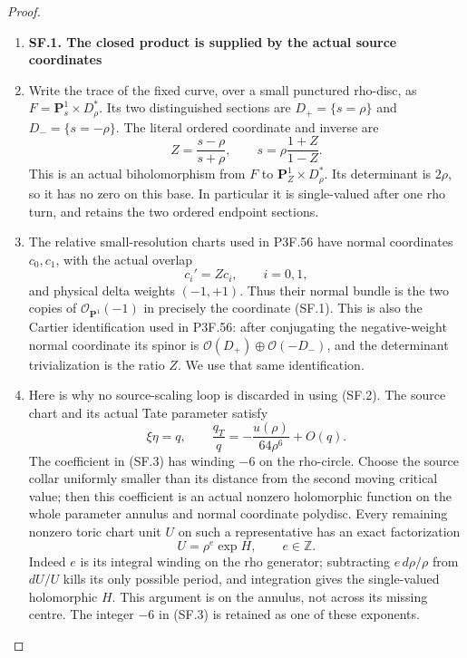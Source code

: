 \begin{proof}
\begin{enumerate}[label=\arabic*.]
\item \par

\medskip\noindent\textbf{SF.1. The closed product is supplied by the actual source coordinates}

\par\nobreak

\item Write the trace of the fixed curve, over a small punctured rho-disc, as
\(F=\mathbf P^1_s\times D_\rho^*\). Its two distinguished sections are
\(D_+=\{s=\rho\}\) and \(D_-=\{s=-\rho\}\). The literal ordered
coordinate and inverse are
\[
 Z=\frac{s-\rho}{s+\rho},\qquad
 s=\rho\frac{1+Z}{1-Z}.                                      \tag{SF.1}
\]
This is an actual biholomorphism from \(F\) to
\(\mathbf P^1_Z\times D_\rho^*\). Its determinant is \(2\rho\), so
it has no zero on this base. In particular it is single-valued after
one rho turn, and retains the two ordered endpoint sections.

\item The relative small-resolution charts used in P3F.56 have normal
coordinates \(c_0,c_1\), with the actual overlap
\[
             c_i'=Zc_i,\qquad i=0,1,                       \tag{SF.2}
\]
and physical delta weights \((-1,+1)\). Thus their normal bundle is the
two copies of \(\mathcal O_{\mathbf P^1}(-1)\) in precisely the
coordinate (SF.1). This is also the Cartier identification used in
P3F.56: after conjugating the negative-weight normal coordinate its
spinor is
\(\mathcal O(D_+)\oplus\mathcal O(-D_-)\), and the determinant
trivialization is the ratio \(Z\). We use that same identification.

\item Here is why no source-scaling loop is discarded in using (SF.2).
The source chart and its actual Tate parameter satisfy
\[
 \xi\eta=q,\qquad
 \frac{q_T}{q}=-\frac{u(\rho)}{64\rho^6}+O(q).               \tag{SF.3}
\]
The coefficient in (SF.3) has winding \(-6\) on the rho-circle.
Choose the source collar uniformly smaller than its distance from the
second moving critical value; then this coefficient is an actual
nonzero holomorphic function on the whole parameter annulus and
normal coordinate polydisc. Every remaining nonzero toric chart unit
\(U\) on such a representative has an exact factorization
\[
                    U=\rho^{e}\exp H,\qquad e\in\mathbb Z. \tag{SF.4}
\]
Indeed \(e\) is its integral winding on the rho generator; subtracting
\(e\,d\rho/\rho\) from \(dU/U\) kills its only possible period,
and integration gives the single-valued holomorphic \(H\). This
argument is on the annulus, not across its missing centre. The integer
\(-6\) in (SF.3) is retained as one of these exponents.


\end{enumerate}
\end{proof}

